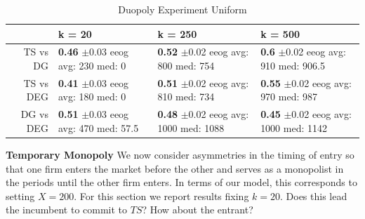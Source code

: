 \documentclass{article}
\theoremstyle{definition}
\begin{document}
\begin{table}[ht]
\centering
\caption{Duopoly Experiment Uniform}
\begin{tabular}{rlll}
  \hline
 & k = 20 & k = 250 & k = 500 \\
  \hline
TS vs DG & \makecell{\textbf{0.46} $\pm$0.03\\ eeog \\ avg: 230\\ med: 0} & \makecell{\textbf{0.52} $\pm$0.02\\ eeog \\ avg: 800\\ med: 754} & \makecell{\textbf{0.6} $\pm$0.02\\ eeog \\ avg: 910\\ med: 906.5} \\
  TS vs DEG & \makecell{\textbf{0.41} $\pm$0.03\\ eeog \\ avg: 180\\ med: 0} & \makecell{\textbf{0.51} $\pm$0.02\\ eeog \\ avg: 810\\ med: 734} & \makecell{\textbf{0.55} $\pm$0.02\\ eeog \\ avg: 970\\ med: 987} \\
  DG vs DEG & \makecell{\textbf{0.51} $\pm$0.03\\ eeog \\ avg: 470\\ med: 57.5} & \makecell{\textbf{0.48} $\pm$0.02\\ eeog \\ avg: 1000\\ med: 1088} & \makecell{\textbf{0.45} $\pm$0.02\\ eeog \\ avg: 1000\\ med: 1142} \\
   \hline
\end{tabular}
\label{sim_unif}
\end{table}

\textbf{Temporary Monopoly} We now consider asymmetries in the timing of entry so that one firm enters the market before the other and serves as a monopolist in the periods until the other firm enters. In terms of our model, this corresponds to setting $X = 200$. For this section we report results fixing $k = 20$. Does this lead the incumbent to commit to $TS$? How about the entrant?
\end{document}
